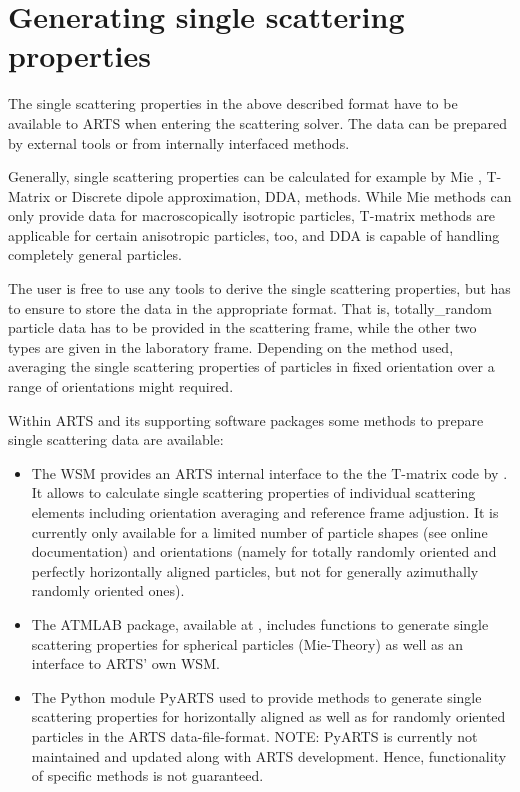 \section{Generating single scattering properties}
\label{sec:clouds:ssdgen}

The single scattering properties in the above described format have to be
available to ARTS when entering the scattering solver. The data can be
prepared by external tools or from internally interfaced methods.

Generally, single scattering properties can be calculated for example by Mie
\citep[e.g.][]{wiscombe80:_improved_ao, maetzler02:_matlab}, T-Matrix
\citep{Mishchenko:98} or Discrete dipole approximation, DDA,
\citep[e.g][]{yurkin11:_adda_jqsrt} methods. While Mie methods can only provide
data for macroscopically isotropic particles, T-matrix methods are applicable
for certain anisotropic particles, too, and DDA is capable of handling
completely general particles.

The user is free to use any tools to derive the single scattering
properties, but has to ensure to store the data in the appropriate format. That
is, totally\_random particle data has to be provided in the
scattering frame, while the other two types are given in the laboratory frame.
Depending on the method used, averaging the single scattering properties of
particles in fixed orientation over a range of orientations might required.

Within ARTS and its supporting software packages some methods to prepare single
scattering data are available:
\begin{itemize}
\item
The WSM  provides an ARTS internal interface
to the the T-matrix code by \citet{Mishchenko:02}. It allows to calculate single
scattering properties of individual scattering elements including orientation
averaging and reference frame adjustion. It is currently only available for a
limited number of particle shapes (see online documentation) and orientations
(namely for totally randomly oriented and perfectly horizontally aligned
particles, but not for generally azimuthally randomly oriented ones).
\item
The ATMLAB package, available at , includes functions to
generate single scattering properties for spherical particles (Mie-Theory) as
well as an interface to ARTS' own  WSM.
\item
The Python module PyARTS used to provide methods to generate single scattering
properties for horizontally aligned as well as for randomly oriented particles
in the ARTS data-file-format. NOTE: PyARTS is currently not maintained and
updated along with ARTS development. Hence, functionality of specific methods is
not guaranteed.
\end{itemize}

